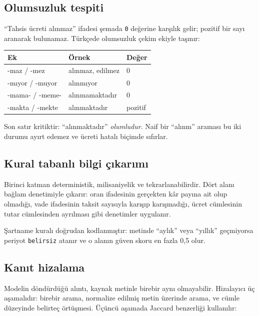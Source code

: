\documentclass[11pt,a4paper]{article}
\begin{document}
\subsection{Olumsuzluk tespiti}

``Tahsis ücreti alınmaz'' ifadesi şemada \texttt{0} değerine karşılık gelir;
pozitif bir sayı aranarak bulunamaz. Türkçede olumsuzluk çekim ekiyle
taşınır:

\begin{center}
\begin{tabular}{lll}
\toprule
\textbf{Ek} & \textbf{Örnek} & \textbf{Değer} \\
\midrule
-maz / -mez & alınmaz, edilmez & 0 \\
-mıyor / -muyor & alınmıyor & 0 \\
-mama- / -meme- & alınmamaktadır & 0 \\
\midrule
-makta / -mekte & alınmaktadır & pozitif \\
\bottomrule
\end{tabular}
\end{center}

Son satır kritiktir: ``alınmaktadır'' \emph{olumludur}. Naif bir ``alınm''
araması bu iki durumu ayırt edemez ve ücreti hatalı biçimde sıfırlar.

\subsection{Kural tabanlı bilgi çıkarımı}

Birinci katman deterministik, milisaniyelik ve tekrarlanabilirdir. Dört alanı
bağlam denetimiyle çıkarır: oran ifadesinin gerçekten kâr payına ait olup
olmadığı, vade ifadesinin taksit sayısıyla karışıp karışmadığı, ücret
cümlesinin tutar cümlesinden ayrılması gibi denetimler uygulanır.

Şartname kuralı doğrudan kodlanmıştır: metinde ``aylık'' veya ``yıllık''
geçmiyorsa periyot \texttt{belirsiz} atanır ve o alanın güven skoru en fazla
0,5 olur.

\subsection{Kanıt hizalama}

Modelin döndürdüğü alıntı, kaynak metinle birebir aynı olmayabilir. Hizalayıcı
üç aşamalıdır: birebir arama, normalize edilmiş metin üzerinde arama, ve
cümle düzeyinde belirteç örtüşmesi. Üçüncü aşamada Jaccard benzerliği
kullanılır:
\end{document}
